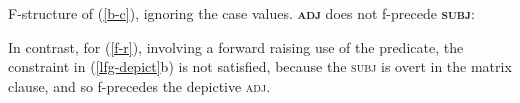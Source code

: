 \documentclass[output=paper,hidelinks]{langscibook}
\begin{document}
\vbox{%
\ea\label{fs-b-c}
F-structure of (\ref{b-c}), ignoring the case values. \textbf{\textsc{adj}}
does not f-precede \textbf{\textsc{subj}}:\\
\z
}
  
In contrast, for (\ref{f-r}), involving a forward raising use of the
predicate, the  constraint in (\ref{lfg-depict}b) is not satisfied,
because the \textsc{subj} is overt in the matrix clause, and so
f-precedes the depictive \textsc{adj}.
\end{document}
